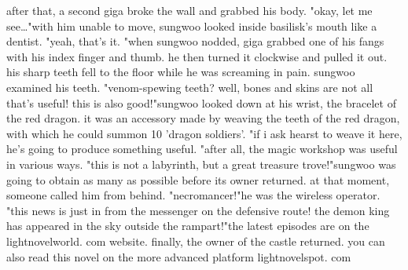 after that, a second giga broke the wall and grabbed his body.
"okay, let me see…"with him unable to move, sungwoo looked inside basilisk's mouth like a dentist.
"yeah, that's it.
"when sungwoo nodded, giga grabbed one of his fangs with his index finger and thumb.
 he then turned it clockwise and pulled it out.
his sharp teeth fell to the floor while he was screaming in pain.
sungwoo examined his teeth.
"venom-spewing teeth? well, bones and skins are not all that's useful! this is also good!"sungwoo looked down at his wrist, the bracelet of the red dragon.
 it was an accessory made by weaving the teeth of the red dragon, with which he could summon 10 'dragon soldiers'.
"if i ask hearst to weave it here, he's going to produce something useful.
"after all, the magic workshop was useful in various ways.
"this is not a labyrinth, but a great treasure trove!"sungwoo was going to obtain as many as possible before its owner returned.
at that moment, someone called him from behind.
"necromancer!"he was the wireless operator.
"this news is just in from the messenger on the defensive route! the demon king has appeared in the sky outside the rampart!"the latest episodes are on the lightnov­elworld.
c‌om website.
finally, the owner of the castle returned.
 you can also read this novel on the more advanced platform lightnovelspot.
com

 